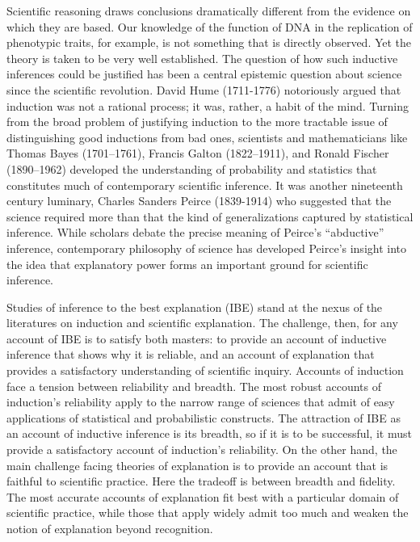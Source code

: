 \documentclass{article}[11pt]
\begin{document}
Scientific reasoning draws conclusions dramatically different from the evidence on which they are based.  Our knowledge of the function of DNA in the replication of phenotypic traits, for example, is not something that is directly observed.  Yet the theory is taken to be very well established.  The question of how such inductive inferences could be justified has been a central epistemic question about science since the scientific revolution.   David Hume (1711-1776) notoriously argued that induction was not a rational process; it was, rather, a habit of the mind.  Turning from the broad problem of justifying induction to the more tractable issue of distinguishing good inductions from bad ones, scientists and mathematicians like Thomas Bayes (1701--1761), Francis Galton (1822--1911), and Ronald Fischer (1890--1962) developed the understanding of probability and statistics that constitutes much of contemporary scientific inference.  It was another nineteenth century luminary, Charles Sanders Peirce (1839-1914) who suggested that the science required more than that the kind of generalizations captured by statistical inference.  While scholars debate the precise meaning of Peirce's ``abductive'' inference, contemporary philosophy  of science has developed Peirce's insight into the idea that explanatory power forms an important ground for scientific inference.

Studies of inference to the best explanation (IBE) stand at the nexus of the literatures on induction and scientific explanation.  The challenge, then, for any account of IBE is to satisfy both masters: to provide an account of inductive inference that shows why it is reliable, and an account of explanation that provides a satisfactory understanding of scientific inquiry.  Accounts of induction face a tension between reliability and breadth.  The most robust accounts of induction's reliability apply to the narrow range of sciences that admit of easy applications of statistical and probabilistic constructs.  The attraction of IBE as an account of inductive inference is its breadth, so if it is to be successful, it must provide a satisfactory account of induction's reliability. On the other hand, the main challenge facing theories of explanation is to provide an account that is faithful to scientific practice.  Here the tradeoff is between breadth and fidelity.  The most accurate accounts of explanation fit best with a particular domain of scientific practice, while those that apply widely admit too much and weaken the notion of explanation beyond recognition.  
\end{document}
